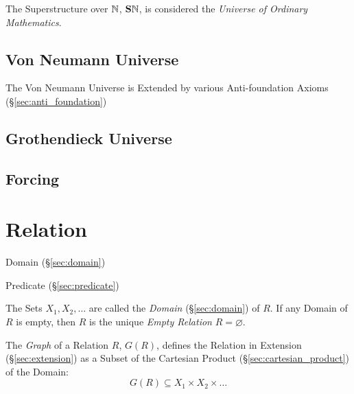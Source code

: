 The Superstructure over $\mathbb{N}$, $\mathbf{S}\mathbb{N}$, is
considered the \emph{Universe of Ordinary Mathematics}.



\subsection{Von Neumann Universe}\label{sec:vonneumann_universe}

The Von Neumann Universe is Extended by various Anti-foundation Axioms
(\S\ref{sec:anti_foundation})



\subsection{Grothendieck Universe}\label{sec:grothendieck_universe}


\subsection{Forcing}\label{sec:forcing}



\section{Relation}\label{sec:set_relation}

Domain (\S\ref{sec:domain})

Predicate (\S\ref{sec:predicate})

The Sets $X_1, X_2, \ldots$ are called the \emph{Domain}
(\S\ref{sec:domain}) of $R$. If any Domain of $R$ is empty, then $R$
is the unique \emph{Empty Relation} $R = \varnothing$.

The \emph{Graph} of a Relation $R$, $G(R)$, defines the Relation in
Extension (\S\ref{sec:extension}) as a Subset of the Cartesian Product
(\S\ref{sec:cartesian_product}) of the Domain:
\[
  G(R) \subseteq X_1 \times X_2 \times \ldots
\]

